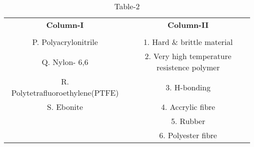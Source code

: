 
\begin{table}[htbp]
  \centering
  \caption{Table-2}
  \label{tab:tables/table2.tex}
  \begin{tabular}{cc}
  \textbf{Column-I} & \textbf{Column-II} \\ \\
    P. Polyacrylonitrile & 1. Hard \& brittle material \\
    Q. Nylon- 6,6 & 2. Very high temperature resistence polymer \\
    R. Polytetrafluoroethylene(PTFE) & 3. H-bonding \\
    S. Ebonite & 4. Accrylic fibre \\
     & 5. Rubber \\
     & 6. Polyester fibre
  \end{tabular}
\end{table}





